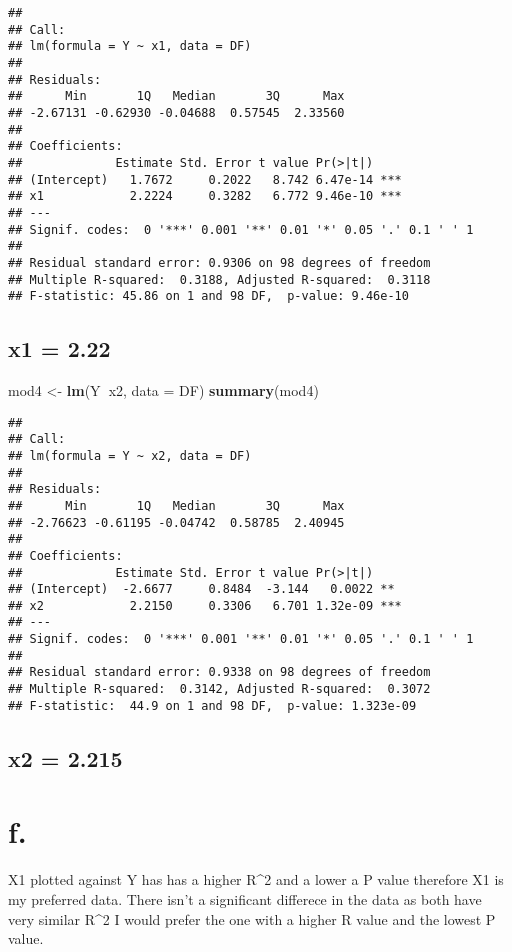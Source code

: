 \documentclass[]{article}
\newenvironment{Shaded}{\begin{snugshade}}{\end{snugshade}}
\newcommand{\KeywordTok}[1]{\textcolor[rgb]{0.13,0.29,0.53}{\textbf{#1}}}
\newcommand{\DataTypeTok}[1]{\textcolor[rgb]{0.13,0.29,0.53}{#1}}
\newcommand{\StringTok}[1]{\textcolor[rgb]{0.31,0.60,0.02}{#1}}
\newcommand{\OperatorTok}[1]{\textcolor[rgb]{0.81,0.36,0.00}{\textbf{#1}}}
\newcommand{\NormalTok}[1]{#1}
\begin{document}
\begin{verbatim}
## 
## Call:
## lm(formula = Y ~ x1, data = DF)
## 
## Residuals:
##      Min       1Q   Median       3Q      Max 
## -2.67131 -0.62930 -0.04688  0.57545  2.33560 
## 
## Coefficients:
##             Estimate Std. Error t value Pr(>|t|)    
## (Intercept)   1.7672     0.2022   8.742 6.47e-14 ***
## x1            2.2224     0.3282   6.772 9.46e-10 ***
## ---
## Signif. codes:  0 '***' 0.001 '**' 0.01 '*' 0.05 '.' 0.1 ' ' 1
## 
## Residual standard error: 0.9306 on 98 degrees of freedom
## Multiple R-squared:  0.3188, Adjusted R-squared:  0.3118 
## F-statistic: 45.86 on 1 and 98 DF,  p-value: 9.46e-10
\end{verbatim}

\subsection{x1 = 2.22}\label{x1-2.22}

\begin{Shaded}
\begin{Highlighting}[]
\NormalTok{mod4 <-}\StringTok{ }\KeywordTok{lm}\NormalTok{(Y}\OperatorTok{~}\NormalTok{x2, }\DataTypeTok{data =}\NormalTok{ DF)}
\KeywordTok{summary}\NormalTok{(mod4)}
\end{Highlighting}
\end{Shaded}

\begin{verbatim}
## 
## Call:
## lm(formula = Y ~ x2, data = DF)
## 
## Residuals:
##      Min       1Q   Median       3Q      Max 
## -2.76623 -0.61195 -0.04742  0.58785  2.40945 
## 
## Coefficients:
##             Estimate Std. Error t value Pr(>|t|)    
## (Intercept)  -2.6677     0.8484  -3.144   0.0022 ** 
## x2            2.2150     0.3306   6.701 1.32e-09 ***
## ---
## Signif. codes:  0 '***' 0.001 '**' 0.01 '*' 0.05 '.' 0.1 ' ' 1
## 
## Residual standard error: 0.9338 on 98 degrees of freedom
## Multiple R-squared:  0.3142, Adjusted R-squared:  0.3072 
## F-statistic:  44.9 on 1 and 98 DF,  p-value: 1.323e-09
\end{verbatim}

\subsection{x2 = 2.215}\label{x2-2.215}

\section{f.}\label{f.-1}

X1 plotted against Y has has a higher R\^{}2 and a lower a P value
therefore X1 is my preferred data. There isn't a significant differece
in the data as both have very similar R\^{}2 I would prefer the one with
a higher R value and the lowest P value.
\end{document}
